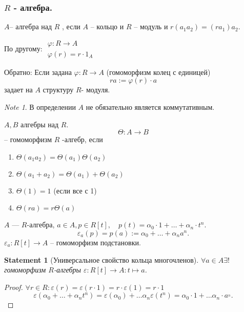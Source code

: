 \documentclass[11pt]{book}
\theoremstyle{definition}
\theoremstyle{plain}
\theoremstyle{plain}
\newtheorem*{st}{Statement}
\theoremstyle{definition}
\theoremstyle{remark}
\newtheorem*{note}{Note}
\begin{document}
 \subsubsection{$ R$ - алгебра.}
 \begin{defn}
     $ A $-- алгебра над $ R$ , если $ A$ -- кольцо и  $ R$  -- модуль и $ r(a_1 a_2) = (r a_1) a_2$.

     По другому:
     $ 
     \begin{array}{l}
\varphi : R \to  A \\
\varphi (r) = r \cdot 1_A
     \end{array}
     $

     Обратно:
     Если задана $ \varphi : R \to  A$ (гомоморфизм колец с единицей) \[
	 ra := \varphi (r) \cdot a
     \] 
     задает на $ A$ структуру $ R$- модуля.
 \end{defn}
 \begin{note}
     В определении $ A$ не обязательно является коммутативным.
 \end{note}
 \begin{defn}
     $ A, B$ алгебры над $ R$.\[
     \Theta : A \to  B
     \]  -- гомоморфизм $ R$ -алгебр, если 
     \begin{enumerate}
	 \item $ \Theta(a_1a_2) =\Theta (a_1) \Theta(a_2) $
	 \item $ \Theta(a_1+a_2) = \Theta(a_1) + \Theta(a_2)$
	 \item $ \Theta (1) = 1 $ (если все с 1)
	 \item  $ \Theta(ra) = r \Theta(a)$
     \end{enumerate}
 \end{defn}
 \begin{defn}
     $ A$ --- $ R$-алгебра, $ a \in  A, p \in  R[t], \quad p(t) = \alpha _0 \cdot  1 + \ldots + \alpha _n \cdot  t ^{n}$.
 \[
     \varepsilon _a(p) = p(a) := \alpha _0 + \ldots + \alpha _n a^{n}
 .\] 
 $ \varepsilon _a: R[t] \to  A$ -- гомоморфизм подстановки.
 \end{defn}
 \begin{st}[Универсальное свойство кольца многочленов]
     $
     \forall  a \in  A \exists ! 
     $ гомоморфизм $ R $-алгебры  $ \varepsilon : R[t] \to A: t \mapsto a$.
 \end{st}
 \begin{proof}
     $ \forall  r \in  R: \varepsilon (r) = \varepsilon (r \cdot 1) = r \cdot  \varepsilon (1) = r \cdot  1$
     \[
	 \varepsilon ( \alpha _0 + \ldots  + \alpha _n t ^{n}) = \varepsilon ( \alpha _0) + \ldots  \alpha _n \varepsilon ( t ^{n}) =  \alpha _0 \cdot  1 + \ldots \alpha _n \cdot  a^{_n}
     .\] 
 \end{proof}
\end{document}

